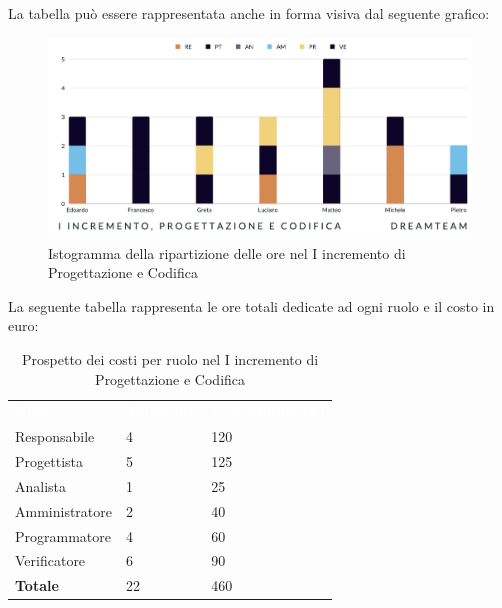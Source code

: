 La tabella può essere rappresentata anche in forma visiva dal seguente grafico:
\begin{figure}[H]
\centering
\includegraphics[scale=0.50]{Sezioni/SezioniPreventivo/grafici/progettazione/Progettazione_I_incremento.png}
\caption{Istogramma della ripartizione delle ore nel I incremento di Progettazione e Codifica}
\end{figure}

La seguente tabella rappresenta le ore totali dedicate ad ogni ruolo e il costo in euro:

\begin{table}[H]
\begin{center}
\renewcommand{\arraystretch}{1.5}
\begin{tabular}{ m{}<{\centering}  m{}<{\centering} m{}<{\centering}}
	\rowcolor{darkblue}
	\textcolor{white}{\textbf{Ruolo}}&\textcolor{white}{\textbf{Totale ore}}&\textcolor{white}{\textbf{Costo totale (\euro)}}\\ 

	Responsabile  & 4 & 120 \\	
	
	Progettista & 5 & 125 \\
	
	Analista & 1 & 25 \\

	Amministratore & 2 & 40 \\
	
	Programmatore & 4 & 60 \\
	
	Verificatore & 6 & 90 \\
	
	\textbf{Totale} & 22 & 460 \\
	
\end{tabular}
\caption{Prospetto dei costi per ruolo nel I incremento di Progettazione e Codifica}
\end{center}
\end{table}

